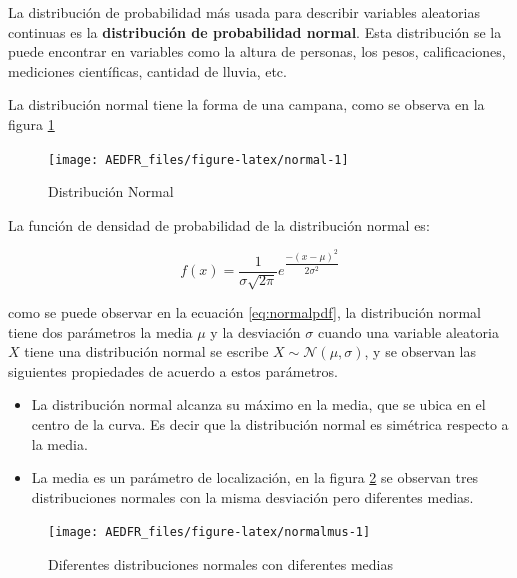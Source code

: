 \documentclass[letterpaper,]{book}
\providecommand{\tightlist}{%
  \setlength{\itemsep}{0pt}\setlength{\parskip}{0pt}}
\begin{document}
La distribución de probabilidad más usada para describir variables aleatorias continuas es la \textbf{distribución de probabilidad normal}. Esta distribución se la puede encontrar en variables como la altura de personas, los pesos, calificaciones, mediciones científicas, cantidad de lluvia, etc.

La distribución normal tiene la forma de una campana, como se observa en la figura \ref{fig:normal}

\begin{figure}[h!]

{\centering \texttt{[image: AEDFR\_files/figure-latex/normal-1]} 

}

\caption{Distribución Normal}\label{fig:normal}
\end{figure}

La función de densidad de probabilidad de la distribución normal es:

\begin{equation} 
f\left(x\right)=\dfrac{1}{\sigma\sqrt{2\pi}}e^{\dfrac{-\left(x-\mu\right)^2}{2\sigma^2}}
\label{eq:normalpdf}
\end{equation}

como se puede observar en la ecuación \eqref{eq:normalpdf}, la distribución normal tiene dos parámetros la media \(\mu\) y la desviación \(\sigma\) cuando una variable aleatoria \(X\) tiene una distribución normal se escribe \(X \sim \mathcal{N}\left(\mu,\sigma \right)\), y se observan las siguientes propiedades de acuerdo a estos parámetros.

\begin{itemize}
\tightlist
\item
  La distribución normal alcanza su máximo en la media, que se ubica en el centro de la curva. Es decir que la distribución normal es simétrica respecto a la media.
\item
  La media es un parámetro de localización, en la figura \ref{fig:normalmus} se observan tres distribuciones normales con la misma desviación pero diferentes medias.
\end{itemize}

\begin{figure}[h!]

{\centering \texttt{[image: AEDFR\_files/figure-latex/normalmus-1]} 

}

\caption{Diferentes distribuciones normales con diferentes medias}\label{fig:normalmus}
\end{figure}
\end{document}
